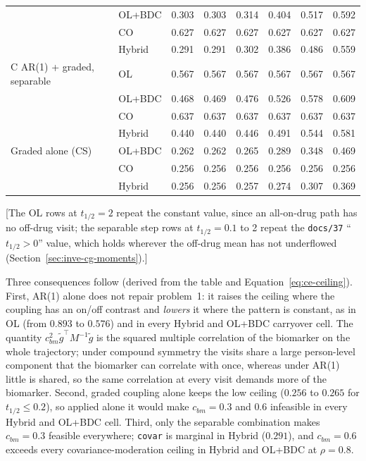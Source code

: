 \documentclass[11pt]{article}
\newcommand{\note}[1]{\textcolor{blue!60!black}{\small [#1]}}
\newcommand{\code}[1]{\texttt{#1}}
\begin{document}
\begin{table}[h]
\begin{tabular}{@{}llcccccc@{}}
 & OL+BDC & 0.303 & 0.303 & 0.314 & 0.404 & 0.517 & 0.592 \\
 & CO & 0.627 & 0.627 & 0.627 & 0.627 & 0.627 & 0.627 \\
 & Hybrid & 0.291 & 0.291 & 0.302 & 0.386 & 0.486 & 0.559 \\
C AR(1) + graded, separable & OL & 0.567 & 0.567 & 0.567 & 0.567 & 0.567 & 0.567 \\
 & OL+BDC & 0.468 & 0.469 & 0.476 & 0.526 & 0.578 & 0.609 \\
 & CO & 0.637 & 0.637 & 0.637 & 0.637 & 0.637 & 0.637 \\
 & Hybrid & 0.440 & 0.440 & 0.446 & 0.491 & 0.544 & 0.581 \\
Graded alone (CS) & OL+BDC & 0.262 & 0.262 & 0.265 & 0.289 & 0.348 & 0.469 \\
 & CO & 0.256 & 0.256 & 0.256 & 0.256 & 0.256 & 0.256 \\
 & Hybrid & 0.256 & 0.256 & 0.257 & 0.274 & 0.307 & 0.369 \\
\bottomrule
\end{tabular}
\end{table}

\noindent \note{The OL rows at $t_{1/2} = 2$ repeat the constant value,
since an all-on-drug path has no off-drug visit; the separable step
rows at $t_{1/2} = 0.1$ to 2 repeat the \code{docs/37} ``$t_{1/2} > 0$''
value, which holds wherever the off-drug mean has not underflowed
(Section~\ref{sec:inve-cg-moments}).}

Three consequences follow (derived from the table and
Equation~\eqref{eq:ce-ceiling}). First, AR(1) alone does not repair
problem~1: it raises the ceiling where the coupling has an on/off
contrast and \emph{lowers} it where the pattern is constant, as in OL
(from $0.893$ to $0.576$) and in every Hybrid and OL+BDC carryover cell.
The quantity $c_{bm}^2\tilde g^\top M^{-1}\tilde g$ is the squared
multiple correlation of the biomarker on the whole trajectory; under
compound symmetry the visits share a large person-level component that
the biomarker can correlate with once, whereas under AR(1) little is
shared, so the same correlation at every visit demands more of the
biomarker. Second, graded coupling alone keeps the low ceiling
($0.256$ to $0.265$ for $t_{1/2} \le 0.2$), so applied alone it would
make $c_{bm} = 0.3$ and $0.6$ infeasible in every Hybrid and OL+BDC
cell. Third, only the separable combination makes $c_{bm} = 0.3$
feasible everywhere; \code{covar} is marginal in Hybrid ($0.291$), and
$c_{bm} = 0.6$ exceeds every covariance-moderation ceiling in Hybrid and
OL+BDC at $\rho = 0.8$.
\end{document}
